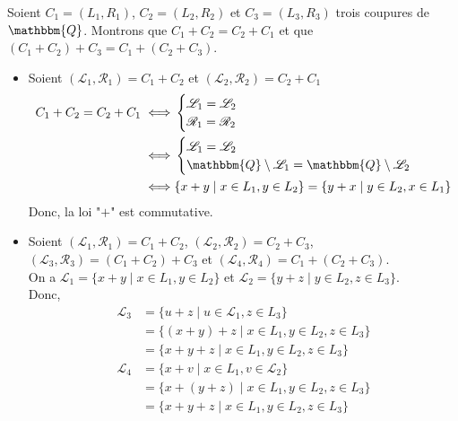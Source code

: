 \documentclass[a4paper]{report}
\newcommand{\Q}{\mathbbm{Q}}
\begin{document}
\begin{section}
		\begin{subsection}{}
			Soient $C_1 = (L_1,R_1)$, $C_2 = (L_2,R_2)$ et $C_3 = (L_3,R_3)$ trois coupures de $\Q$.
			Montrons que $C_1+C_2=C_2+C_1$ et que $(C_1+C_2)+C_3 = C_1 + (C_2+C_3)$.
			\\
			\begin{itemize}
				\item Soient $(\mathcal{L}_1,\mathcal{R}_1) = C_1 + C_2$ et $(\mathcal{L}_2,\mathcal{R}_2) = C_2 + C_1$
					\begin{align*}
						C_1+C_2=C_2+C_1 \iff&
						\begin{cases}
							\mathcal{L}_1 = \mathcal{L}_2\\
							\mathcal{R}_1 = \mathcal{R}_2\\
						\end{cases}\\
						\iff&
						\begin{cases}
							\mathcal{L}_1 = \mathcal{L}_2\\
							\Q\setminus\mathcal{L}_1 = \Q\setminus\mathcal{L}_2
						\end{cases}\\
						\iff&
						\{x + y  \mid x \in L_1, y \in L_2\} = 
						\{ y + x  \mid  y \in L_2, x \in L_1\} 
					\end{align*}
					Donc, la loi "$+$" est commutative.
				\item Soient $(\mathcal{L}_1, \mathcal{R}_1) = C_1+C_2$, $(\mathcal{L}_2, \mathcal{R}_2) = C_2+C_3$, $(\mathcal{L}_3,\mathcal{R}_3) = (C_1+C_2)+C_3$ et $(\mathcal{L}_4,\mathcal{R}_4) = C_1 + (C_2+C_3)$.\\
					On a $\mathcal{L}_1 = \{x + y  \mid x \in L_1, y \in L_2\}$ et $\mathcal{L}_2 = \{y + z  \mid y \in L_2, z \in L_3\}$.\\
					Donc, 
					\begin{align*}
						\mathcal{L}_3 &= \{u + z  \mid u \in \mathcal{L}_1, z \in L_3\}\\
						&= \{(x + y) + z  \mid x \in L_1, y\in L_2, z \in L_3\}\\
						&= \{x + y + z  \mid x \in L_1, y\in L_2, z \in L_3\}
					\end{align*}
					\begin{align*}
							\mathcal{L}_4 &= \{x + v  \mid  x \in L_1, v \in \mathcal{L}_2\}\\
							&= \{x + (y + z)  \mid x \in L_1, y \in L_2, z \in L_3\}  \\
							&= \{x + y + z  \mid x \in L_1, y \in L_2, z \in L_3\}

\end{align*}
\end{itemize}
\end{subsection}
\end{section}
\end{document}
